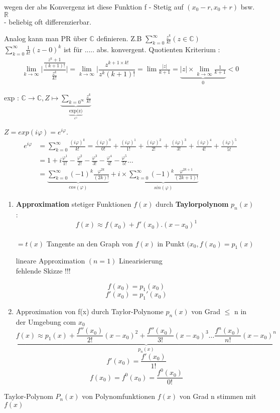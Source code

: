 \begin{remark}
wegen der abs Konvergenz ist diese Funktion f 
- Stetig auf $( x_0 - r , x_0 + r)$ bsw. $\mathbb{R}$\\
- beliebig oft differenzierbar. 
\end{remark}

\begin{remark}
Analog kann man PR über $\mathbb{C}$ definieren.
Z.B $\sum_{k=0}^{\infty}{\frac{z^k}{k!}}(z \in \mathbb{C})$ 
$\sum_{k=0}^{\infty}{\frac{1}{k!}(z-0)^k}$ ist für ..... abs. konvergent.
Quotienten Kriterium : 
\begin{align*}
\lim_{k \to \infty}{\bigg| \dfrac{\frac{z^k+1}{(k+1)!}}{\frac{z^k}{k!}}\bigg|} = \lim_{k \to \infty}{\bigg|\dfrac{z^{k+1 \times k!}}{z^k(k+1)!}} = \lim{\frac{|z|}{k+1}} = \underbrace{|z|\times \lim_{k \to \infty}{\frac{1}{k+1}}}_{0}<0
\end{align*} 

exp : $\mathbb{C} \rightarrow \mathbb{C} , Z \longmapsto  \underbrace{\sum_{k=0^{\infty}}{\frac{z^k}{k!}}}_{\underbrace{\text{exp(z)}}_{e^z}}$

$Z = exp(i \varphi)= e ^{i \varphi}$.
\begin{align*}
e ^{i \varphi} &= \sum_{k=0}^{\infty}{\frac{(i \varphi)^k}{k!}} = \frac{(i \varphi)^0}{0!} + \frac{(i \varphi)^1}{1!} + \frac{(i \varphi)^2}{2!} + \frac{(i \varphi)^3}{3!} + \frac{(i \varphi)^4}{4!} + \frac{(i \varphi)^5}{5!}\\
 &= 1 +  i \frac{\varphi^1}{1!} - \frac{\varphi^2}{2!} - \frac{\varphi^3}{3!} - \frac{\varphi^4}{4!} - \frac{\varphi^5}{5!} \dots \\
 &= \underbrace{\sum_{k=0}^{\infty}{(-1)^k \frac{\varphi^{2k}}{(2k)!}}}_{cos(\varphi)} + i \times \underbrace{\sum_{k=0}^{\infty}{(-1)^k \frac{\varphi^{2k+1}}{(2k+1)!}}}_{sin(\varphi)}
\end{align*}
\end{remark}
\begin{enumerate}
\item \textbf{Approximation} stetiger Funktionen $f(x)$ durch \textbf{Taylorpolynom} $p_n(x)$ :
$$f(x) \approx f(x_0)+f'(x_0).(x-x_0)^1$$\\
$= t(x)$ Tangente an den Graph von $f(x)$ in Punkt $(x_0 , f(x_0) = p_1(x)$
 
lineare Approximation $(n=1)$
Linearisierung\\
fehlende Skizze !!! 

\begin{remark}
\[ f(x_0)= p_1(x_0) \]
\[ f'(x_0)= p_1'(x_0) \]
\end{remark}

\item Approximation von f(x) durch Taylor-Polynome $p_n(x)$ von Grad $\leq$ n in der Umgebung com $x_0$
\[ \underbrace{f(x) \approx p_1(x) + 
\frac{f''(x_0)}{2!}(x-x_0)^2 +
\frac{f''(x_0)}{3!}(x-x_0)^3 \dots
\frac{f^n(x_0)}{n!}(x-x_0)^n}_{p_n(x)}\]
\[f'(x_0) = \frac{f'(x_0)}{1!} \]
\[f(x_0) = f^0(x_0) = \frac{f^0(x_0)}{0!}\]
\end{enumerate}
\begin{remark}
Taylor-Polynom $P_n(x)$ von Polynomfunktionen $f(x)$ von Grad n stimmen mit  $f(x)$ 
\end{remark}

